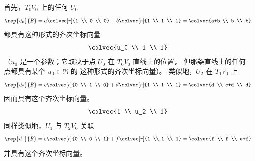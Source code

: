 \begin{exercises}
\begin{answer}
\begin{exparts}
\begin{equation*}
          \end{equation*}
        \partsitem
          首先，$T_0V_0$ 上的任何 $U_0$
          \begin{equation*}
            \rep{\vec{u}_0}{B}=a\colvec[r]{1 \\ 0 \\ 0}
                               +b\colvec[r]{1 \\ 1 \\ 1}
                              =\colvec{a+b \\ b \\ b}
          \end{equation*}
          都具有这种形式的齐次坐标向量
          \begin{equation*}
            \colvec{u_0 \\ 1 \\ 1}      
          \end{equation*}
          （$u_0$ 是一个参数；它取决于点 $U_0$ 在 $T_0V_0$ 直线上的位置，
          但那条直线上的任何点都具有某个 $u_0\in\Re$ 的
          这种形式的齐次坐标向量）。
          类似地，$U_2$ 在 $T_1V_0$ 上
          \begin{equation*}
            \rep{\vec{u}_2}{B}=c\colvec[r]{0 \\ 1 \\ 0}
                                +d\colvec[r]{1 \\ 1 \\ 1}
                              =\colvec{d \\ c+d \\ d}
          \end{equation*}
          因而具有这个齐次坐标向量。
          \begin{equation*}
            \colvec{1 \\ u_2 \\ 1}
          \end{equation*}
          同样类似地，$U_1$ 与 $T_2V_0$ 关联
          \begin{equation*}
            \rep{\vec{u}_1}{B}=e\colvec[r]{0 \\ 0 \\ 1}
                                +f\colvec[r]{1 \\ 1 \\ 1}
                              =\colvec{f \\ f \\ e+f}  
          \end{equation*}
          并具有这个齐次坐标向量。

\end{exparts}
\end{answer}
\end{exercises}
